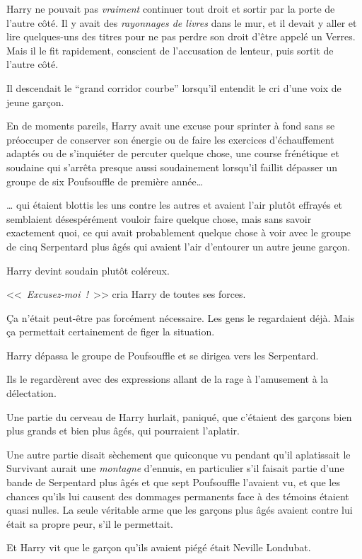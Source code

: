 Harry ne pouvait pas \emph{vraiment} continuer tout droit et sortir par la porte de l'autre côté. Il y avait des \emph{rayonnages de livres} dans le mur, et il devait y aller et lire quelques-uns des titres pour ne pas perdre son droit d'être appelé un Verres. Mais il le fit rapidement, conscient de l'accusation de lenteur, puis sortit de l'autre côté.

Il descendait le “grand corridor courbe” lorsqu'il entendit le cri d'une voix de jeune garçon.

En de moments pareils, Harry avait une excuse pour sprinter à fond sans se préoccuper de conserver son énergie ou de faire les exercices d'échauffement adaptés ou de s'inquiéter de percuter quelque chose, une course frénétique et soudaine qui s'arrêta presque aussi soudainement lorsqu'il faillit dépasser un groupe de six Poufsouffle de première année…

… qui étaient blottis les uns contre les autres et avaient l'air plutôt effrayés et semblaient désespérément vouloir faire quelque chose, mais sans savoir exactement quoi, ce qui avait probablement quelque chose à voir avec le groupe de cinq Serpentard plus âgés qui avaient l'air d'entourer un autre jeune garçon.

Harry devint soudain plutôt coléreux.

<<~\emph{Excusez-moi~!}~>> cria Harry de toutes ses forces.

Ça n'était peut-être pas forcément nécessaire. Les gens le regardaient déjà. Mais ça permettait certainement de figer la situation.

Harry dépassa le groupe de Poufsouffle et se dirigea vers les Serpentard.

Ils le regardèrent avec des expressions allant de la rage à l'amusement à la délectation.

Une partie du cerveau de Harry hurlait, paniqué, que c'étaient des garçons bien plus grands et bien plus âgés, qui pourraient l'aplatir.

Une autre partie disait sèchement que quiconque vu pendant qu'il aplatissait le Survivant aurait une \emph{montagne} d'ennuis, en particulier s'il faisait partie d'une bande de Serpentard plus âgés et que sept Poufsouffle l'avaient vu, et que les chances qu'ils lui causent des dommages permanents face à des témoins étaient quasi nulles. La seule véritable arme que les garçons plus âgés avaient contre lui était sa propre peur, s'il le permettait.

Et Harry vit que le garçon qu'ils avaient piégé était Neville Londubat.

